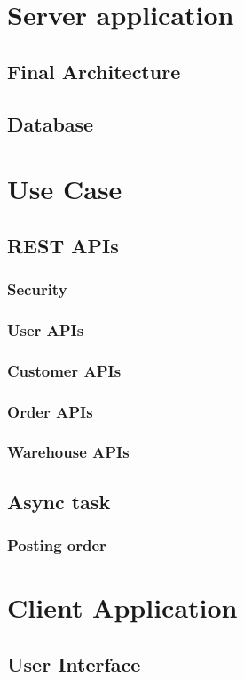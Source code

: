 \section{Server application}
\subsection{Final Architecture}
\subsection{Database}

\section{Use Case}
\subsection{REST APIs}
\subsubsection{Security}
\subsubsection{User APIs}
\subsubsection{Customer APIs}
\subsubsection{Order APIs}
\subsubsection{Warehouse APIs}
\subsection{Async task}
\subsubsection{Posting order}

\section{Client Application}
\subsection{User Interface}
